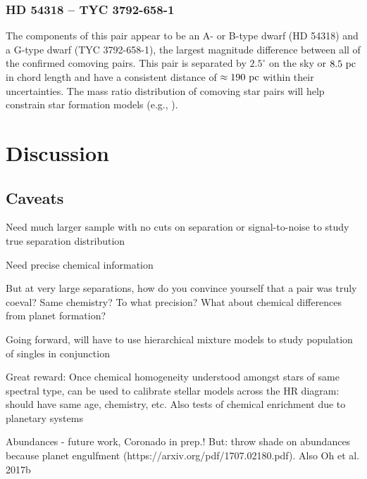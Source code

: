 \documentclass[modern, letterpaper]{aastex61}
\begin{document}
\subsubsection{HD 54318 -- TYC 3792-658-1}

The components of this pair appear to be an A- or B-type dwarf (HD 54318) and a
G-type dwarf (TYC 3792-658-1), the largest magnitude difference between all of
the confirmed comoving pairs.
This pair is separated by $2.5^\circ$ on the sky or $8.5~\mathrm{pc}$ in chord length
and have a consistent distance of $\approx 190~\mathrm{pc}$ within their uncertainties.
The mass ratio distribution of comoving star pairs will help constrain star
formation models (e.g., \citealt{Raghavan:2010}).

\section{Discussion} \label{sec:discussion}

\subsection{Caveats} \label{sec:caveats}

Need much larger sample with no cuts on separation or signal-to-noise to study
true separation distribution

Need precise chemical information

But at very large separations, how do you convince yourself that a pair was truly coeval? Same chemistry? To what precision? What about chemical differences from planet formation?

Going forward, will have to use hierarchical mixture models to study population of singles in conjunction

Great reward: Once chemical homogeneity understood amongst stars of same spectral type, can be used to calibrate stellar models across the HR diagram: should have same age, chemistry, etc. Also tests of chemical enrichment due to planetary systems

Abundances - future work, Coronado in prep.! But: throw shade on abundances
because planet engulfment (https://arxiv.org/pdf/1707.02180.pdf). Also Oh et al.
2017b

\end{document}
